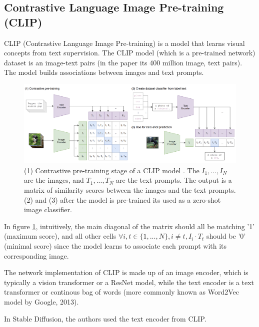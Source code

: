 \subsection{Contrastive Language Image Pre-training (CLIP)}

\label{subsec:clip}

CLIP (Contrastive Language Image Pre-training) \cite{openai_clip} is a model that learns visual concepts from text supervision. The CLIP model (which is a pre-trained network) dataset is an image-text pairs (in the paper its 400 million image, text pairs). The model builds associations between images and text prompts. 

\begin{figure}
    \centering
    \includegraphics[width=1\textwidth]{images/diffusion_models/stable_diffusion/clip.png}
    \caption{(1) Contrastive pre-training stage of a CLIP model \cite{openai_clip}. The $I_1, ..., I_N$ are the images, and $T_1, ..., T_N$ are the text prompts. The output is a matrix of similarity scores between the images and the text prompts. (2) and (3) after the model is pre-trained its used as a zero-shot image classifier.}
    \label{fig:openai_clip}
\end{figure}

In figure \ref{fig:openai_clip}, intuitively, the main diagonal of the matrix should all be matching '1' (maximum score), and all other cells $\forall i,t \in \{1, ..., N\}, i \neq t, I_i \cdot T_t$ should be '0' (minimal score) since the model learns to associate each prompt with its corresponding image.

The network implementation of CLIP is made up of an image encoder, which is typically a vision transformer \cite{vision_transformer} or a ResNet \cite{resnet} model, while the text encoder is a text transformer \cite{transformer} or continous bag of words \cite{cbow_word2vec} (more commonly known as Word2Vec model by Google, 2013).

In Stable Diffusion, the authors used the text encoder from CLIP. %












